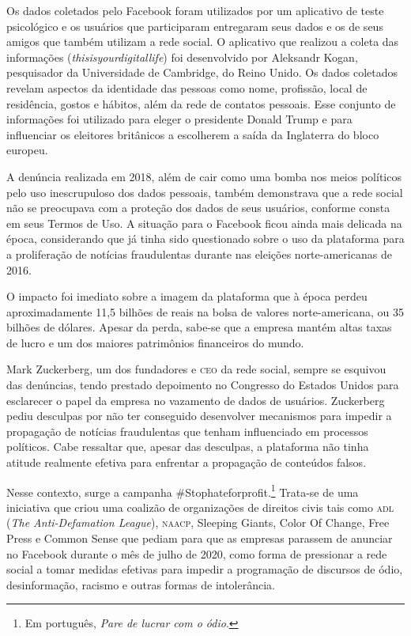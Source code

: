 Os dados coletados pelo Facebook foram utilizados por um aplicativo de
teste psicológico e os usuários que participaram entregaram
seus dados e os de seus amigos que também utilizam a rede social. O
aplicativo que realizou a coleta das
informações (\textit{thisisyourdigitallife}) foi desenvolvido por
Aleksandr Kogan, pesquisador da Universidade de Cambridge, do Reino
Unido. Os dados coletados revelam aspectos da identidade das pessoas
como nome, profissão, local de residência, gostos e hábitos, além da
rede de contatos pessoais. Esse conjunto de informações foi utilizado
para eleger o presidente Donald Trump e para influenciar os eleitores
britânicos a escolherem a saída da Inglaterra do bloco europeu.

A denúncia realizada em 2018, além de cair como uma bomba nos meios
políticos pelo uso inescrupuloso dos dados pessoais, também demonstrava
que a rede social não se preocupava com a proteção dos dados de seus
usuários, conforme consta em seus Termos de Uso. A situação para o
Facebook ficou ainda mais delicada na época, considerando que já tinha
sido questionado sobre o uso da plataforma para a proliferação de
notícias fraudulentas durante nas eleições norte-americanas de 2016.

O impacto foi imediato sobre a imagem da plataforma que à época perdeu
aproximadamente 11,5 bilhões de reais na bolsa de valores norte-americana, ou 
35 bilhões de dólares. Apesar da perda, sabe-se que a empresa mantém altas taxas de
lucro e um dos maiores patrimônios financeiros do mundo.

Mark Zuckerberg, um dos fundadores e \textsc{ceo} da rede social, sempre se
esquivou das denúncias, tendo prestado depoimento no Congresso do
Estados Unidos para esclarecer o papel da empresa no vazamento de dados
de usuários. Zuckerberg pediu desculpas por não ter conseguido
desenvolver mecanismos para impedir a propagação de notícias
fraudulentas que tenham influenciado em processos políticos. Cabe
ressaltar que, apesar das desculpas, a plataforma não tinha atitude
realmente efetiva para enfrentar a propagação de conteúdos falsos.

Nesse contexto, surge a campanha \#Stophateforprofit.\footnote{Em português, \textit{Pare de lucrar com o ódio}.} Trata-se de uma iniciativa que
criou uma coalizão de organizações de direitos civis tais como \textsc{adl} (\textit{The Anti-Defamation League}), \textsc{naacp}, Sleeping Giants, Color Of
Change, Free Press e Common Sense que pediam para que as empresas
parassem de anunciar no Facebook durante o mês de julho de 2020, como
forma de pressionar a rede social a tomar medidas efetivas para impedir
a programação de discursos de ódio, desinformação, racismo e outras
formas de intolerância.

